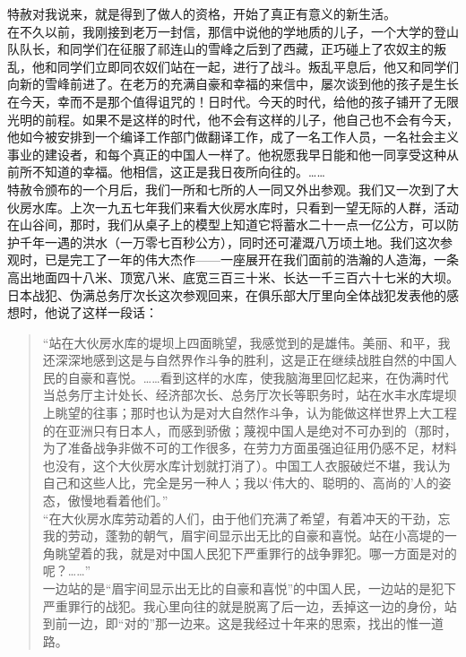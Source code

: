 特赦对我说来，就是得到了做人的资格，开始了真正有意义的新生活。\\

在不久以前，我刚接到老万一封信，那信中说他的学地质的儿子，一个大学的登山队队长，和同学们在征服了祁连山的雪峰之后到了西藏，正巧碰上了农奴主的叛乱，他和同学们立即同农奴们站在一起，进行了战斗。叛乱平息后，他又和同学们向新的雪峰前进了。在老万的充满自豪和幸福的来信中，屡次谈到他的孩子是生长在今天，幸而不是那个值得诅咒的！日时代。今天的时代，给他的孩子铺开了无限光明的前程。如果不是这样的时代，他不会有这样的儿子，他自己也不会有今天，他如今被安排到一个编译工作部门做翻译工作，成了一名工作人员，一名社会主义事业的建设者，和每个真正的中国人一样了。他祝愿我早日能和他一同享受这种从前所不知道的幸福。他相信，这正是我日夜所向往的。……\\

特赦令颁布的一个月后，我们一所和七所的人一同又外出参观。我们又一次到了大伙房水库。上次一九五七年我们来看大伙房水库时，只看到一望无际的人群，活动在山谷间，那时，我们从桌子上的模型上知道它将蓄水二十一点一亿公方，可以防护千年一遇的洪水（一万零七百秒公方），同时还可灌溉八万顷土地。我们这次参观时，已是完工了一年的伟大杰作——一座展开在我们面前的浩瀚的人造海，一条高出地面四十八米、顶宽八米、底宽三百三十米、长达一千三百六十七米的大坝。日本战犯、伪满总务厅次长这次参观回来，在俱乐部大厅里向全体战犯发表他的感想时，他说了这样一段话：\\

\begin{quote}
	“站在大伙房水库的堤坝上四面眺望，我感觉到的是雄伟。美丽、和平，我还深深地感到这是与自然界作斗争的胜利，这是正在继续战胜自然的中国人民的自豪和喜悦。……看到这样的水库，使我脑海里回忆起来，在伪满时代当总务厅主计处长、经济部次长、总务厅次长等职务时，站在水丰水库堤坝上眺望的往事；那时也认为是对大自然作斗争，认为能做这样世界上大工程的在亚洲只有日本人，而感到骄傲；蔑视中国人是绝对不可办到的（那时，为了准备战争非做不可的工作很多，在劳力方面虽强迫征用仍感不足，材料也没有，这个大伙房水库计划就打消了）。中国工人衣服破烂不堪，我认为自己和这些人比，完全是另一种人；我以‘伟大的、聪明的、高尚的’人的姿态，傲慢地看着他们。”\\

“在大伙房水库劳动着的人们，由于他们充满了希望，有着冲天的干劲，忘我的劳动，蓬勃的朝气，眉宇间显示出无比的自豪和喜悦。站在小高堤的一角眺望着的我，就是对中国人民犯下严重罪行的战争罪犯。哪一方面是对的呢？……”\\

一边站的是“眉宇间显示出无比的自豪和喜悦”的中国人民，一边站的是犯下严重罪行的战犯。我心里向往的就是脱离了后一边，丢掉这一边的身份，站到前一边，即“对的”那一边来。这是我经过十年来的思索，找出的惟一道路。\\
\end{quote}

